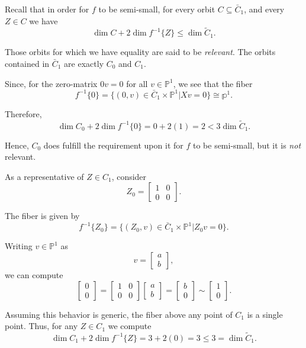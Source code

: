 \documentclass{memoir}
\theoremstyle{definition}
\begin{document}
	Recall that in order for $f$ to be semi-small, for every orbit $C\subseteq\bar{C}_1$, and every $Z\in C$ we have
	$$\dim C+2\dim f^{-1}\{Z\}\leq\dim \tilde{C}_1.$$
	
	Those orbits for which we have equality are said to be \emph{relevant}.  
	The orbits contained in $\bar{C}_1$ are exactly $C_0$ and $C_1$.  
	
	Since, for the zero-matrix $0v=0$ for all $v\in \mathbb{P}^1$, we see that the fiber 
	$$f^{-1}\{0\}=\{(0, v)\in \bar{C}_1\times\mathbb{P}^1 | Xv=0\}\cong \mathbb{p}^1.$$
	
	Therefore,
	$$\dim C_0+2\dim f^{-1}\{0\}=0 + 2(1)=2< 3 \dim \tilde{C}_1.$$
	
	Hence, $C_0$ does fulfill the requirement upon it for $f$ to be semi-small, but it is \emph{not} relevant.  
	
	As a representative of $Z\in C_1$, consider
	$$Z_0=\begin{bmatrix}
		1 & 0 \\
		0 & 0
	\end{bmatrix}.$$
	
	The fiber is given by 
	$$f^{-1}\{Z_0\}=\{(Z_0, v)\in \bar{C}_1\times\mathbb{P}^1 | Z_0v=0\}.$$
	
	Writing $v\in \mathbb{P}^1$ as 
	$$v=\begin{bmatrix}
		a\\
		b
	\end{bmatrix},$$
	we can compute 
	$$\begin{bmatrix}
		0 \\
		0 
	\end{bmatrix}=\begin{bmatrix}
		1 & 0 \\
		0 & 0 
	\end{bmatrix}\begin{bmatrix}
		a \\
		b
	\end{bmatrix}=\begin{bmatrix}
		b\\
		0
	\end{bmatrix}\sim\begin{bmatrix}
		1 \\
		0
	\end{bmatrix}.$$
	
	Assuming this behavior is generic, the fiber above any point of $C_1$ is a single point. 
	Thus, for any $Z\in C_1$ we compute 
	$$\dim C_1+2\dim f^{-1}\{Z\}=3+2(0)=3\leq 3=\dim \tilde{C}_1.$$
	
\end{document}
